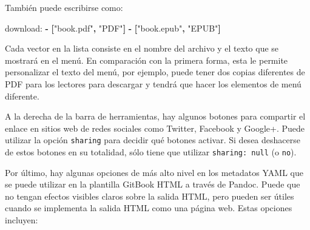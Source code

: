 \documentclass[12pt,]{krantz}
\makeatletter
\newenvironment{Shaded}{\begin{snugshade}}{\end{snugshade}}
\newcommand{\KeywordTok}[1]{\textcolor[rgb]{0.13,0.29,0.53}{\textbf{#1}}}
\newcommand{\StringTok}[1]{\textcolor[rgb]{0.31,0.60,0.02}{#1}}
\newcommand{\FunctionTok}[1]{\textcolor[rgb]{0.00,0.00,0.00}{#1}}
\newenvironment{kframe}{%
\medskip{}
\setlength{\fboxsep}{.8em}
 \def\at@end@of@kframe{}%
 \ifinner\ifhmode%
  \def\at@end@of@kframe{\end{minipage}}%
  \begin{minipage}{\columnwidth}%
 \fi\fi%
 \def\FrameCommand##1{\hskip\@totalleftmargin \hskip-\fboxsep
 \colorbox{shadecolor}{##1}\hskip-\fboxsep
     \hskip-\linewidth \hskip-\@totalleftmargin \hskip\columnwidth}%
 \MakeFramed {\advance\hsize-\width
   \@totalleftmargin\z@ \linewidth\hsize
   \@setminipage}}%
 {\par\unskip\endMakeFramed%
 \at@end@of@kframe}
\renewenvironment{Shaded}{\begin{kframe}}{\end{kframe}}
\theoremstyle{definition}
\theoremstyle{definition}
\theoremstyle{definition}
\theoremstyle{remark}
\makeatother
\begin{document}
También puede escribirse como:

\begin{Shaded}
\begin{Highlighting}[]
    \FunctionTok{download:}
      \KeywordTok{-} \KeywordTok{[}\StringTok{"book.pdf"}\KeywordTok{,} \StringTok{"PDF"}\KeywordTok{]}
      \KeywordTok{-} \KeywordTok{[}\StringTok{"book.epub"}\KeywordTok{,} \StringTok{"EPUB"}\KeywordTok{]}
\end{Highlighting}
\end{Shaded}

Cada vector en la lista consiste en el nombre del archivo y el texto que
se mostrará en el menú. En comparación con la primera forma, esta le
permite personalizar el texto del menú, por ejemplo, puede tener dos
copias diferentes de PDF para los lectores para descargar y tendrá que
hacer los elementos de menú diferente.

A la derecha de la barra de herramientas, hay algunos botones para
compartir el enlace en sitios web de redes sociales como Twitter,
Facebook y Google+. Puede utilizar la opción \texttt{sharing} para
decidir qué botones activar. Si desea deshacerse de estos botones en su
totalidad, sólo tiene que utilizar \texttt{sharing:\ null} (o
\texttt{no}).

Por último, hay algunas opciones de más alto nivel en los metadatos YAML
que se puede utilizar en la plantilla GitBook HTML a través de Pandoc.
Puede que no tengan efectos visibles claros sobre la salida HTML, pero
pueden ser útiles cuando se implementa la salida HTML como una página
web. Estas opciones incluyen:
\end{document}
